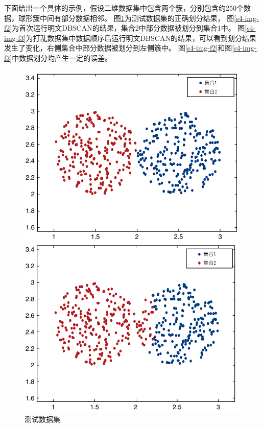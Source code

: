 下面给出一个具体的示例，假设二维数据集中包含两个簇，分别包含约250个数据，球形簇中间有部分数据相邻。
图\ref{s4-img-f1}为测试数据集的正确划分结果，
图\ref{s4-img-f2}为首次运行明文DBSCAN的结果，集合2中部分数据被划分到集合1中。
图\ref{s4-img-f3}为打乱数据集中数据顺序后运行明文DBSCAN的结果，可以看到划分结果发生了变化，右侧集合中部分数据被划分到左侧簇中。
图\ref{s4-img-f2}和图\ref{s4-img-f3}中数据划分均产生一定的误差。

\begin{figure}[htbp] %
	\begin{minipage}[t]{0.3\linewidth}
		\includegraphics[width=\linewidth]{img/expr.png}
		\caption{测试数据集}
		\label{s4-img-f1}
	\end{minipage}%
	\hfill%
	\begin{minipage}[t]{0.3\linewidth}
		\includegraphics[width=\linewidth]{img/expr2.png}

\end{minipage}
\end{figure}
